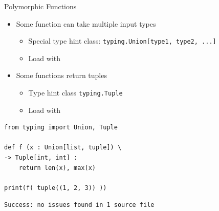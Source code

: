 \begin{frame}[fragile]{Polymorphic Functions}
%
\begin{itemize}
\item Some function can take multiple input types
	\begin{itemize}
	\item Special type hint class: \texttt{typing.Union[type1, type2, ...]}
	\item Load with 
	\end{itemize}
\item Some functions return tuples
	\begin{itemize}
	\item Type hint class \texttt{typing.Tuple}
	\item Load with 
	\end{itemize}
\end{itemize}
%
\begin{tcbraster}[raster columns=2,
                  raster equal height,
                  nobeforeafter,
                  raster column skip=0.5cm]
\begin{codebox}
\begin{verbatim}
from typing import Union, Tuple

def f (x : Union[list, tuple]) \
-> Tuple[int, int] :
    return len(x), max(x)

print(f( tuple((1, 2, 3)) ))
\end{verbatim}
\end{codebox}
%
\begin{cmdbox}
\begin{verbatim}
Success: no issues found in 1 source file
\end{verbatim}
\end{cmdbox}
\end{tcbraster}
%
\end{frame}


